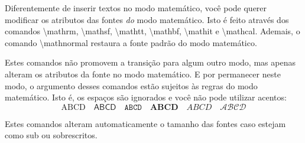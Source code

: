 \documentclass[a4paper,10pt]{article}
\newcommand{\comando}[1]{{\textbackslash\color{blue!70}\normalfont#1}}
\begin{document}
	Diferentemente de inserir textos no modo matemático, você pode querer modificar os
	atributos das fontes \emph{do} modo matemático. Isto é feito através dos comandos
	\comando{mathrm}, \comando{mathsf}, \comando{mathtt}, \comando{mathbf}, \comando{mathit}
	e \comando{mathcal}. Ademais, o comando \comando{mathnormal} restaura a fonte padrão do modo matemático.
	
	Estes comandos não promovem a transição para algum outro modo, mas apenas alteram
	os atributos da fonte no modo matemático. E por permanecer neste modo, o argumento
	desses comandos estão sujeitos às regras do modo matemático. Isto é, os espaços
	são ignorados e você não pode utilizar acentos:
	\[\mathrm{ABCD}\quad
	  \mathsf{ABCD}\quad
	  \mathtt{ABCD}\quad
	  \mathbf{ABCD}\quad
	  \mathit{ABCD}\quad
	  \mathcal{A  B  C  D}\] %
	
	Estes comandos alteram automaticamente o tamanho das fontes caso estejam
	como sub ou sobrescritos.
\end{document}
